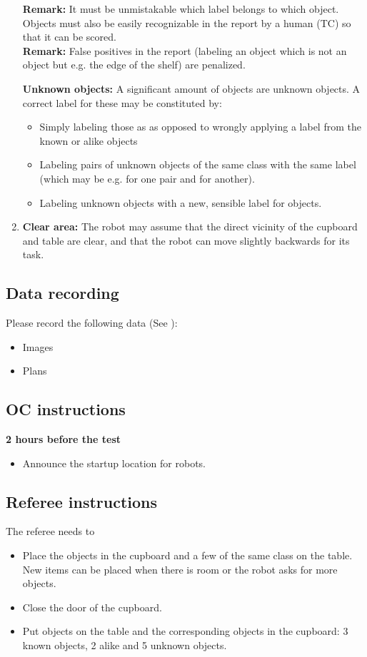 \begin{enumerate}
		\textbf{Remark:} It must be unmistakable which label belongs to which object. Objects must also be easily recognizable in the report by a human (TC) so that it can be scored. \\

		\textbf{Remark:} False positives in the report (labeling an object which is not an object but e.g. the edge of the shelf) are penalized.

		\textbf{Unknown objects:} A significant amount of objects are unknown objects. A correct label for these may be constituted by: 
		\begin{itemize}
			\item Simply labeling those as  as opposed to wrongly applying a label from the known or alike objects
			\item Labeling pairs of unknown objects of the same class with the same label (which may be e.g.  for one pair and  for another). 
			\item Labeling unknown objects with a new, sensible label for objects.
	 	\end{itemize}

	\item \textbf{Clear area:} The robot may assume that the direct vicinity of the cupboard and table are clear, and that the robot can move slightly backwards for its task.
\end{enumerate}

\subsection{Data recording}
Please record the following data (See ):
\begin{itemize}
	\item Images
	\item Plans
\end{itemize}

\subsection{OC instructions}

\textbf{2 hours before the test}
\begin{itemize}
    \item Announce the startup location for robots.
\end{itemize}

\subsection{Referee instructions}
The referee needs to
\begin{itemize}
	\item Place the objects in the cupboard and a few of the same class on the table. New items can be placed when there is room or the robot asks for more objects. 
	\item Close the door of the cupboard. 
	\item Put objects on the table and the corresponding objects in the cupboard: 3 known objects, 2 alike and 5 unknown objects. 
\end{itemize}


